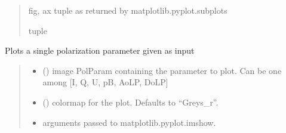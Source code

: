 \documentclass[letterpaper,10pt,english]{sphinxmanual}
\begin{document}
\begin{fulllineitems}
\begin{fulllineitems}
\begin{quote}
\begin{description}
\sphinxAtStartPar
fig, ax tuple as returned by matplotlib.pyplot.subplots

\sphinxAtStartPar
tuple

\end{description}\end{quote}

\end{fulllineitems}


\begin{fulllineitems}
\label{\detokenize{micropolarray:micropolarray.micropol_image.MicropolImage.show_pol_param}}
\pysigstartsignatures
{}
\pysigstopsignatures
\sphinxAtStartPar
Plots a single polarization parameter given as input
\begin{quote}\begin{description}
\begin{itemize}
\item {} 
\sphinxAtStartPar
{} () \textendash{} image PolParam containing the parameter to plot. Can be one among {[}I, Q, U, pB, AoLP, DoLP{]}

\item {} 
\sphinxAtStartPar
{} (\sphinxstyleliteralemphasis{\sphinxupquote{, }}) \textendash{} colormap for the plot. Defaults to “Greys\_r”.

\item {} 
\sphinxAtStartPar
{} \textendash{} arguments passed to matplotlib.pyplot.imshow.


\end{itemize}
\end{description}
\end{quote}
\end{fulllineitems}
\end{fulllineitems}
\end{document}
